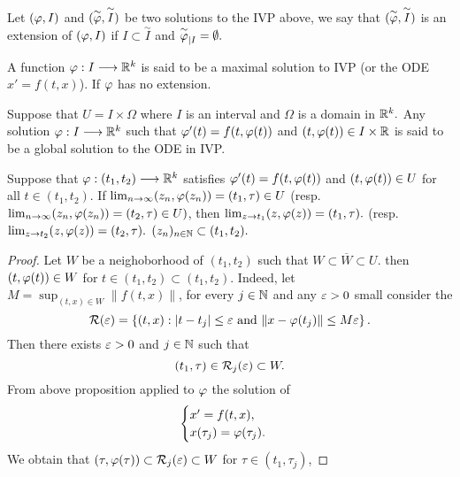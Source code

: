 \begin{definition}[]
Let $(\varphi, I) $ and $( \overset{\sim}{\varphi}, \overset{\sim}{I})$  
be two solutions to the IVP above, we say that $(\overset{\sim}{\varphi} , \overset{\sim}{I} ) $ is an extension 
of $(\varphi, I) $ if $I \subset \overset{\sim}{I} $ and 
$\overset{\sim}{\varphi} _{|I}= \emptyset.$ 
\end{definition}
\begin{definition}
A function $ \varphi : I \longrightarrow \mathbb{R} ^k  $ is said
to be a maximal solution to IVP (or the ODE $x' = f(t, x) $). 
If $\varphi$ has no extension.
\end{definition}
\begin{definition}
Suppose that $U = I \times \Omega $ where $I$ is 
an interval and $\Omega$ is a domain in 
$\mathbb{R} ^k.$ Any solution $ \varphi : I \longrightarrow \mathbb{R} ^k  $ such that 
$\varphi'(t) = f(t, \varphi(t) )   $  and $(t, \varphi(t) ) \in   I \times \mathbb{R}  $ is said
to be a global solution to the ODE in IVP.
\end{definition}
\begin{corollary}[]
Suppose that $ \varphi : (t_1, t_2)  \longrightarrow \mathbb{R} ^k  $ satisfies $\varphi'(t) = f(t, \varphi(t)) $ and $(t, \varphi(t) ) 
\in  U$ for all $t \in  (t_1, t_2)$. If $\lim_{n \to \infty} (z_n , \varphi(z_n ) ) = (t_1, \tau ) \in  U$ (resp. $\lim_{n \to \infty} 
(z_n , \varphi(z_n ) ) = (t_2, \tau )  \in   U)$, then $\lim_{z \to t_1} (z, \varphi(z) ) = (t_1, \tau ).$ (resp. $\lim_{z \to t_2} 
(z, \varphi(z) ) = (t_2 , \tau ).$ $(z_n ) _{n \in  \mathbb{N}} \subset (t_1, t_2 ).$ 
\end{corollary}
\begin{proof}
Let $W$ be a neighoborhood of $(t_1, t_2) $ such that $W \subset \overline{W} \subset U$. then 
$(t, \varphi(t) ) \in  W$ for $t \in  (t_1, t_2) \subset (t_1, t_2).$ Indeed, let $M = \sup_{(t, x) \in  W} \| f(t, x)  \| $, for every
$j \in  \mathbb{N}$ and any $\varepsilon  > 0$ small consider the 
\[
\mathcal{R} (\varepsilon )  = \left\{ (t, x) : \left| t-t_{j} \right| \leq \varepsilon  \text{ and }  \| x-\varphi(t_{j})  \| \leq M \varepsilon  \right\}.
\]
Then there exists $\varepsilon  > 0$ and $j \in  \mathbb{N}$ such that 
\[
  (t_1, \tau ) \in  \mathcal{R} _{j}(\varepsilon ) \subset W.
\]
From above proposition applied to $\varphi$ the solution of 
\[
  \begin{cases}
  x' =  f(t,x),\\
  x(\tau _{j}) = \varphi(\tau _{j}).
  \end{cases}
\]
We obtain that $(\tau , \varphi(\tau ) ) \subset \mathcal{R} _{j}(\varepsilon ) \subset W$ for $\tau  \in  (t_1, \tau _{j}) $,
\end{proof}
